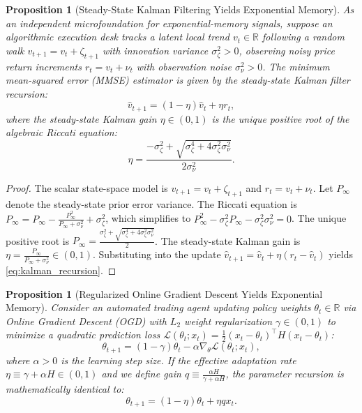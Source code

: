 \documentclass[12pt]{article}
\newtheorem{proposition}[theorem]{Proposition}
\theoremstyle{definition}
\theoremstyle{remark}
\newcommand{\R}{\mathbb{R}}
\begin{document}
\begin{proposition}[Steady-State Kalman Filtering Yields Exponential Memory]
\label{prop:kalman}
As an independent microfoundation for exponential-memory signals, suppose an algorithmic execution desk tracks a latent local trend $v_t \in \R$ following a random walk $v_{t+1} = v_t + \zeta_{t+1}$ with innovation variance $\sigma_\zeta^2 > 0$, observing noisy price return increments $r_t = v_t + \nu_t$ with observation noise $\sigma_\nu^2 > 0$. The minimum mean-squared error (MMSE) estimator is given by the steady-state Kalman filter recursion:
\begin{equation}
\hat{v}_{t+1} = (1 - \eta) \hat{v}_t + \eta r_t,
\label{eq:kalman_recursion}
\end{equation}
where the steady-state Kalman gain $\eta \in (0, 1)$ is the unique positive root of the algebraic Riccati equation:
\begin{equation}
\eta = \frac{-\sigma_\zeta^2 + \sqrt{\sigma_\zeta^4 + 4 \sigma_\zeta^2 \sigma_\nu^2}}{2 \sigma_\nu^2}.
\end{equation}
\end{proposition}

\begin{proof}
The scalar state-space model is $v_{t+1} = v_t + \zeta_{t+1}$ and $r_t = v_t + \nu_t$. Let $P_{\infty}$ denote the steady-state prior error variance. The Riccati equation is $P_\infty = P_\infty - \frac{P_\infty^2}{P_\infty + \sigma_\nu^2} + \sigma_\zeta^2$, which simplifies to $P_\infty^2 - \sigma_\zeta^2 P_\infty - \sigma_\zeta^2 \sigma_\nu^2 = 0$. The unique positive root is $P_\infty = \frac{\sigma_\zeta^2 + \sqrt{\sigma_\zeta^4 + 4\sigma_\zeta^2 \sigma_\nu^2}}{2}$. The steady-state Kalman gain is $\eta = \frac{P_\infty}{P_\infty + \sigma_\nu^2} \in (0, 1)$. Substituting into the update $\hat{v}_{t+1} = \hat{v}_t + \eta (r_t - \hat{v}_t)$ yields \eqref{eq:kalman_recursion}.
\end{proof}

\begin{proposition}[Regularized Online Gradient Descent Yields Exponential Memory]
\label{prop:ogd}
Consider an automated trading agent updating policy weights $\theta_t \in \R$ via Online Gradient Descent (OGD) with $L_2$ weight regularization $\gamma \in (0, 1)$ to minimize a quadratic prediction loss $\mathcal{L}(\theta_t; x_t) = \frac{1}{2} (x_t - \theta_t)^\top H (x_t - \theta_t)$:
\begin{equation}
\theta_{t+1} = (1 - \gamma) \theta_t - \alpha \nabla_\theta \mathcal{L}(\theta_t; x_t),
\end{equation}
where $\alpha > 0$ is the learning step size. If the effective adaptation rate $\eta \equiv \gamma + \alpha H \in (0, 1)$ and we define gain $q \equiv \frac{\alpha H}{\gamma + \alpha H}$, the parameter recursion is mathematically identical to:
\begin{equation}
\theta_{t+1} = (1 - \eta) \theta_t + \eta q x_t.
\end{equation}
\end{proposition}
\end{document}
